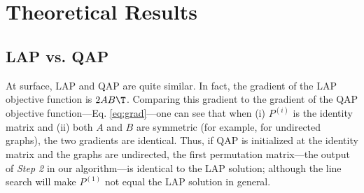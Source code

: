 \documentclass[10pt,journal,cspaper,compsoc]{IEEEtran}
\newcommand{\PmcP}{P \in \mc{P}}
\begin{document}


\section{Theoretical Results} %
\label{sec:theoretical_results}

\subsection{LAP vs. QAP} %
\label{sub:lap_vs_qap}

At surface, LAP and QAP are quite similar.  In fact, the gradient of the LAP objective function is $2AB\T$.
Comparing this gradient to the gradient of the QAP objective function---Eq. \eqref{eq:grad}---one can see that when (i) $P^{(i)}$ is the identity matrix and (ii) both $A$ and $B$ are symmetric (for example, for undirected graphs), the two gradients are identical.  Thus, if QAP is initialized at the identity matrix and the graphs are undirected, the first permutation matrix---the output of \emph{Step 2} in our \rqap algorithm---is identical to the LAP solution; although the line search will make $P^{(1)}$ not equal the LAP solution in general. %
\end{document}
